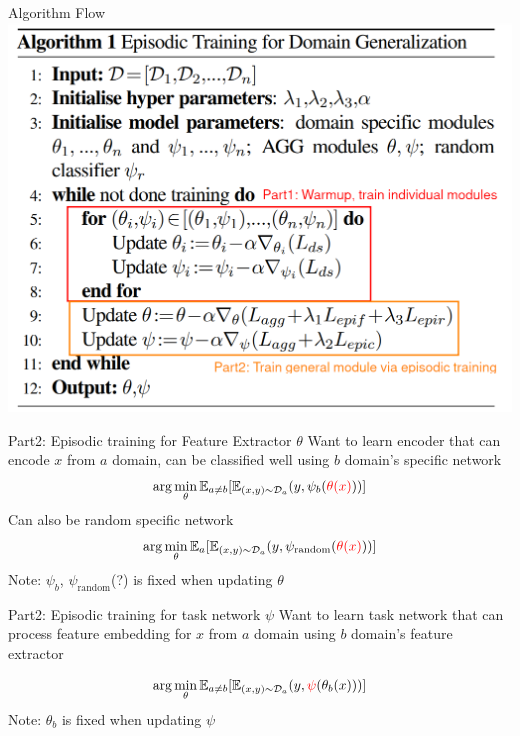 \documentclass{beamer}
\begin{document}
\begin{frame}{Algorithm Flow}
  \includegraphics[width=.7\textwidth]{fig/epi-alg-flow.png}
\end{frame}

\begin{frame}{Part2: Episodic training for Feature Extractor $\theta$}
    Want to learn encoder that can encode $x$ from $a$ domain, can be classified well using $b$ domain's specific network
    \begin{equation*}
      \arg \min_\theta \mathbb{E}_{ a \neq b} [\mathbb{E}_{(x,y) \sim \mathcal{D}_a}(y, \psi_b({\color{red}{\theta(x)}}))] 
    \end{equation*}
    \vspace{1em}
    Can also be random specific network
    \begin{equation*}
      \arg \min_\theta \mathbb{E}_{a} [\mathbb{E}_{(x,y) \sim \mathcal{D}_a}(y, \psi_{\text{random}}({\color{red}{\theta(x)}}))] 
    \end{equation*}
    \vspace{1em}
    Note: $\psi_b$, $\psi_{\text{random}}$(?) is fixed when updating $\theta$
\end{frame}

\begin{frame}[t]{Part2: Episodic training for task network $\psi$}
  Want to learn task network that can process feature embedding for $x$ from $a$ domain using $b$ domain's feature extractor

  \begin{equation*}
    \arg \min_\theta \mathbb{E}_{ a \neq b} [\mathbb{E}_{(x,y) \sim \mathcal{D}_a}(y, {\color{red}{\psi}}(\theta_b(x)))] 
  \end{equation*}
    Note: $\theta_b$ is fixed when updating $\psi$
\end{frame}
\end{document}
